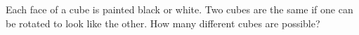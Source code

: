 Each face of a cube is painted black or white. Two cubes are the same if one can be rotated to look like the other. How many different cubes are possible?
